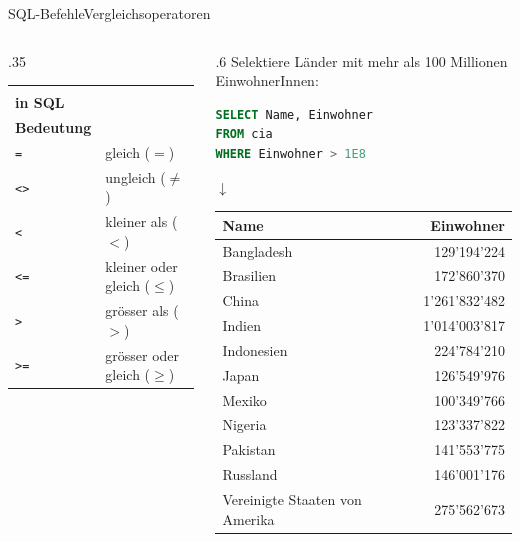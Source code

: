 \begin{frame}[fragile]{SQL-Befehle}{Vergleichsoperatoren}
	\begin{columns}[c]
	\centering
	\begin{column}{.35\textwidth}
	\begin{table}[H]
	        \centering
	        \tiny
	        \begin{tabular}{l|l}
	        \makecell{\textbf{Operator}\\\textbf{in SQL}} & \makecell{\textbf{Mathematische}\\\textbf{Bedeutung}} \\\midrule 
	             \texttt{=} & gleich ($=$)\\
	             \texttt{<>} & ungleich ($\neq$) \\
	             \texttt{<} & kleiner als ($<$)\\
	             \texttt{<=} & kleiner oder gleich ($\leq$) \\
	             \texttt{>} & grösser als ($>$) \\
	             \texttt{>=} & grösser oder gleich ($\geq$)
	        \end{tabular}
	    \end{table}
	\end{column}
	\begin{column}{.6\textwidth}
	\scriptsize
	Selektiere Länder mit mehr als 100 Millionen EinwohnerInnen:
	\begin{lstlisting}[language=SQL, basicstyle=\ttfamily\scriptsize]
SELECT Name, Einwohner
FROM cia
WHERE Einwohner > 1E8
\end{lstlisting}
	\centering$\downarrow$
	\begin{table}
	  \centering\tiny
	  \begin{tabular}{lr}
	    \toprule
	    \textbf{Name} & \textbf{Einwohner} \\
	    \midrule
	    Bangladesh & 129'194'224 \\
	    Brasilien & 172'860'370 \\
	    China & 1'261'832'482 \\
	    Indien & 1'014'003'817 \\
	    Indonesien & 224'784'210 \\
	    Japan & 126'549'976 \\
	    Mexiko & 100'349'766 \\
	    Nigeria & 123'337'822 \\
	    Pakistan & 141'553'775 \\
	    Russland & 146'001'176 \\
	    Vereinigte Staaten von Amerika & 275'562'673 \\
	    \bottomrule
	  \end{tabular}
	\end{table}
	
	\end{column}
	\end{columns}
\end{frame}

